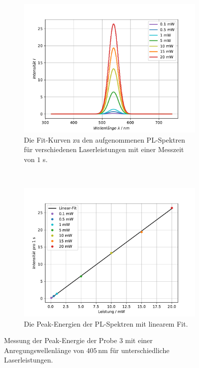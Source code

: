\begin{figure}[H]
\centering
	\begin{subfigure}[t]{0.45\textwidth}
	\includegraphics[width=\textwidth]{Plots/aufgabe1c2_1s.pdf}
	\caption{Die Fit-Kurven zu den aufgenommenen PL-Spektren f\"{u}r verschiedenen Laserleistungen mit einer Messzeit von $1$ s.}
	\label{abb:verLeistung2}
	\end{subfigure}
	~
	\begin{subfigure}[t]{0.45\textwidth}
	\includegraphics[width=\textwidth]{Plots/aufgabe1c3.pdf}
	\caption{Die Peak-Energien der PL-Spektren mit linearem Fit.}
	\label{abb:Leistungen_fit}
	\end{subfigure}
\caption{Messung der Peak-Energie der Probe 3 mit einer Anregungswellenl\"{a}nge von $405 \,$nm f\"{u}r unterschiedliche Laserleistungen.}
\label{abb:auf1c}
\end{figure}

